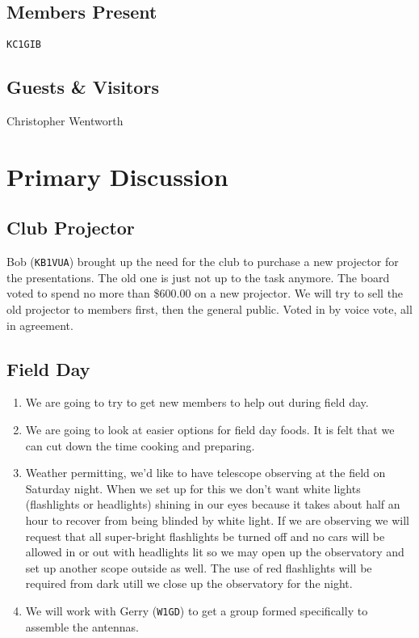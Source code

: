 \documentclass[10pt,letterpaper]{article}
\begin{document}
\subsection{Members Present}
\texttt{KC1GIB}

\subsection{Guests \& Visitors}
Christopher Wentworth

\section{Primary Discussion}

\subsection{Club Projector}
Bob (\texttt{KB1VUA}) brought up the need for the club to purchase a new projector for the presentations. The old one is just not up to the task anymore. The board voted to spend no more than \$600.00 on a new projector. We will try to sell the old projector to members first, then the general public. Voted in by voice vote, all in agreement.

\subsection{Field Day}
\begin{enumerate}
  \item We are going to try to get new members to help out during field day.
  \item We are going to look at easier options for field day foods. It is felt that we can cut down the time cooking and preparing.
  \item Weather permitting, we'd like to have telescope observing at the field on Saturday night. When we set up for this we don't want white lights (flashlights or headlights) shining in our eyes because it takes about half an hour to recover from being blinded by white light. If we are observing we will request that all super-bright flashlights be turned off and no cars will be allowed in or out with headlights lit so we may open up the observatory and set up another scope outside as well. The use of red flashlights will be required from dark utill we close up the observatory for the night.
  \item We will work with Gerry (\texttt{W1GD}) to get a group formed specifically to assemble the antennas.
\end{enumerate}
\end{document}
